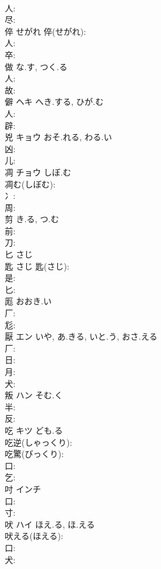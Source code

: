 \documentclass[8pt]{extreport}
\begin{document}
\begin{CJK}{UTF8}{min}
\\	人: 
\\	尽: 
\\	倅		せがれ			倅(せがれ): 
\\	人: 
\\	卒: 
\\	做		な.す, つく.る				
\\	人: 
\\	故: 
\\	僻	ヘキ	へき.する, ひが.む		
\\	人: 
\\	辟: 
\\	兇	キョウ	おそ.れる, わる.い		
\\	凶: 
\\	儿: 
\\	凋	チョウ	しぼ.む		
\\	凋む(しぼむ): 
\\	冫: 
\\	周: 
\\	剪		き.る, つ.む				
\\	前: 
\\	刀: 
\\	匕		さじ				
\\	匙		さじ			匙(さじ): 
\\	是: 
\\	匕: 
\\	厖		おおき.い				
\\	厂: 
\\	尨: 
\\	厭	エン	いや, あ.きる, いと.う, おさ.える		
\\	厂: 
\\	日: 
\\	月: 
\\	犬: 
\\	叛	ハン	そむ.く		
\\	半: 
\\	反: 
\\	吃	キツ	ども.る		
\\	吃逆(しゃっくり): 
\\	吃驚(びっくり): 
\\	口: 
\\	乞: 
\\	吋		インチ				
\\	口: 
\\	寸: 
\\	吠	ハイ	ほえ.る, ほ.える		
\\	吠える(ほえる): 
\\	口: 
\\	犬: 

\end{CJK}
\end{document}
